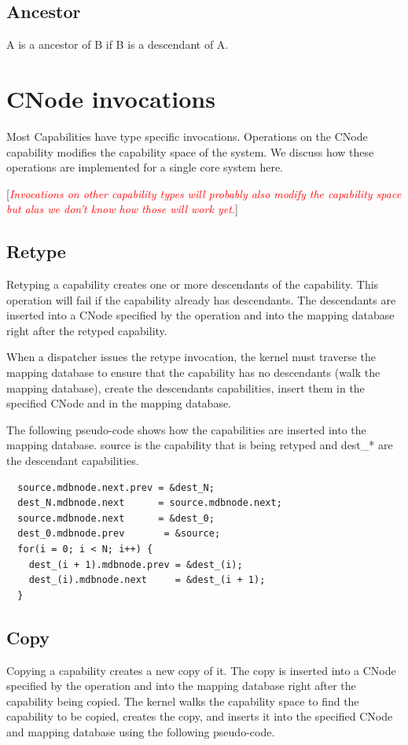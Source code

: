 \documentclass[a4paper,twoside]{report} %
\newcommand{\note}[1]{[\textcolor{red}{\textit{#1}}]}
\begin{document}
\subsection{Ancestor}

A is a ancestor of B if B is a descendant of A.

\section{CNode invocations}

Most Capabilities have type specific invocations.  Operations on the
CNode capability modifies the capability space of the system. We
discuss how these operations are implemented for a single core system
here.

\note{Invocations on other capability types will probably also modify
  the capability space but alas we don't know how those will work yet.}

\subsection{Retype}
Retyping a capability creates one or more descendants of the
capability. This operation will fail if the capability already has
descendants. The descendants are inserted into a CNode specified by
the operation and into the mapping database right after the retyped
capability.

When a dispatcher issues the retype invocation, the kernel must
traverse the mapping database to ensure that the capability has no
descendants (walk the mapping database), create the descendants
capabilities, insert them in the specified CNode and in the mapping
database.

The following pseudo-code shows how the capabilities are inserted into
the mapping database. source is the capability that is being retyped
and dest\_* are the descendant capabilities.

{\scriptsize
\begin{verbatim}
  source.mdbnode.next.prev = &dest_N;
  dest_N.mdbnode.next      = source.mdbnode.next;
  source.mdbnode.next      = &dest_0;
  dest_0.mdbnode.prev       = &source;
  for(i = 0; i < N; i++) {
    dest_(i + 1).mdbnode.prev = &dest_(i);
    dest_(i).mdbnode.next     = &dest_(i + 1);
  }
\end{verbatim}
}

\subsection{Copy}
Copying a capability creates a new copy of it. The copy is inserted
into a CNode specified by the operation and into the mapping database
right after the capability being copied.  The kernel walks the
capability space to find the capability to be copied, creates the
copy, and inserts it into the specified CNode and mapping database
using the following pseudo-code.
\end{document}
